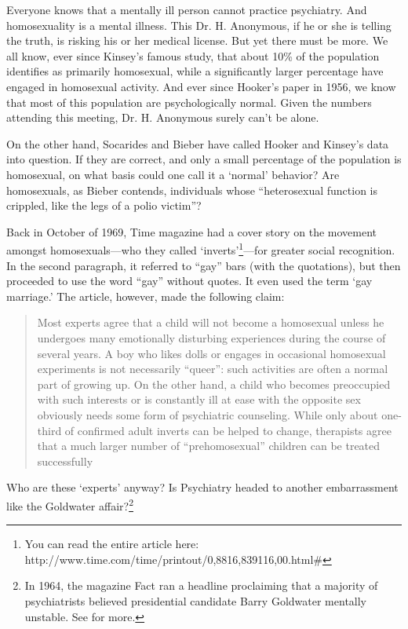 \begin{refsection}
Everyone knows that a mentally ill person cannot practice psychiatry. And homosexuality is a mental illness. This Dr. H. Anonymous, if he or she is telling the truth, is risking his or her medical license. But yet there must be more. We all know, ever since Kinsey's famous study, that about 10\% of the population identifies as primarily homosexual, while a significantly larger percentage have engaged in homosexual activity. And ever since Hooker's paper in 1956, we know that most of this population are psychologically normal. Given the numbers attending this meeting, Dr. H. Anonymous surely can't be alone.

On the other hand, Socarides and Bieber have called Hooker and Kinsey's data into question. If they are correct, and only a small percentage of the population is homosexual, on what basis could one call it a `normal' behavior? Are homosexuals, as Bieber contends, individuals whose ``heterosexual function is crippled, like the legs of a polio victim''? 

Back in October of 1969, Time magazine had a cover story on the movement amongst homosexuals---who they called `inverts'\footnote{You can read the entire article here: http:\slash \slash www.time.com\slash time\slash printout\slash 0,8816,839116,00.html\#}---for greater social recognition. In the second paragraph, it referred to ``gay'' bars (with the quotations), but then proceeded to use the word ``gay'' without quotes. It even used the term `gay marriage.' The article, however, made the following claim:

\begin{quote}

Most experts agree that a child will not become a homosexual unless he undergoes many emotionally disturbing experiences during the course of several years. A boy who likes dolls or engages in occasional homosexual experiments is not necessarily ``queer'': such activities are often a normal part of growing up. On the other hand, a child who becomes preoccupied with such interests or is constantly ill at ease with the opposite sex obviously needs some form of psychiatric counseling. While only about one-third of confirmed adult inverts can be helped to change, therapists agree that a much larger number of ``prehomosexual'' children can be treated successfully
\end{quote}

Who are these `experts' anyway? Is Psychiatry headed to another embarrassment like the Goldwater affair?\footnote{In 1964, the magazine Fact ran a headline proclaiming that a majority of psychiatrists believed presidential candidate Barry Goldwater mentally unstable. See  for more.}


\end{refsection}
